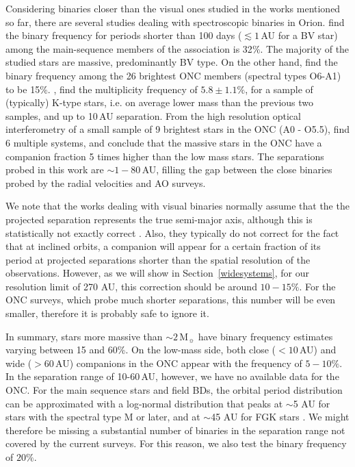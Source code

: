 \documentclass[a4paper,fleqn,usenatbib]{mnras}
\begin{document}
Considering binaries closer than the visual ones studied in the works mentioned so far, there are several studies dealing
with spectroscopic binaries in Orion. \citet{morrell91} find the binary frequency for periods shorter than
100 days ($\lesssim1\,$AU for a BV star) among the main-sequence members of the association is 32$\%$. 
The majority
of the studied stars are massive, predominantly BV type. On the other hand, \citet{abt91} find the binary frequency among the 
26 brightest ONC members (spectral types O6-A1) to be 15$\%$. 
\citet{kounkel16a}, find the multiplicity frequency of $5.8\pm1.1\%$, 
for a sample of (typically) K-type stars, i.e. on average lower mass than the previous two samples, and up to 10\,AU separation. 
From the high resolution optical interferometry of a small sample of 9 brightest stars in the ONC (A0 - O5.5), \citet{grellmann13}
find 6 multiple systems, and conclude that the massive stars in the ONC have a companion fraction 5 times higher than the low mass stars. 
The separations probed in this work are $\sim 1-80\,$AU, filling the gap between the close binaries probed by the radial velocities and AO surveys.

We note that the works dealing with visual binaries normally assume that the the projected separation represents the true semi-major axis, although this is
statistically not exactly correct \citep{kuiper35}. Also, they typically do not correct for the fact that at inclined orbits, a companion  
will appear for a certain fraction of its period at projected separations shorter than the spatial resolution of the observations. 
However, as we will show in Section~\ref{widesystems}, for our resolution limit of 270 AU, this correction should be around $10-15\%$. For the ONC
surveys, which probe much shorter separations, this number will be even smaller, therefore it is probably safe to ignore it.


In summary, stars more massive than $\sim 2$\,M$_{\sun}$ have binary frequency estimates varying between 15 and 60\%. 
On the low-mass side, both close ($<10\,$AU) and wide ($>60$\,AU) companions in the ONC appear with the frequency of $5-10\%$. In the separation range
of 10-60\,AU, however, we have no available data for the ONC. 
For the main sequence stars and field BDs, the orbital period distribution can be approximated with a log-normal distribution that peaks at $\sim$5 AU for stars with the spectral type M or later, and at $\sim$45 AU for FGK stars \citep{duchene&kraus13}. 
We might therefore be missing a substantial number of binaries in the separation range not covered by the current surveys.
For this reason, we also test the binary frequency of $20\%$.%
\end{document}
